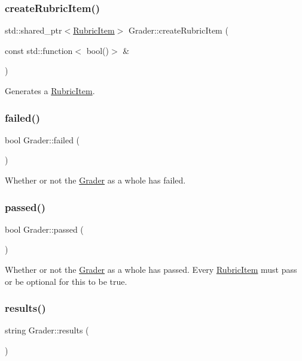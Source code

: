 \subsubsection{\texorpdfstring{create\+Rubric\+Item()}{createRubricItem()}\hspace{0.1cm}{\footnotesize\ttfamily [3/3]}}
{\footnotesize\ttfamily std\+::shared\+\_\+ptr$<$\hyperlink{class_rubric_item}{Rubric\+Item}$>$ Grader\+::create\+Rubric\+Item (\begin{DoxyParamCaption}\item[{const std\+::function$<$ bool()$>$ \&}]{ }\end{DoxyParamCaption})}

Generates a \hyperlink{class_rubric_item}{Rubric\+Item}. \hypertarget{class_grader_acac97fc41ff9582c6bcb167f7537ee08}{}\label{class_grader_acac97fc41ff9582c6bcb167f7537ee08} 
\subsubsection{\texorpdfstring{failed()}{failed()}}
{\footnotesize\ttfamily bool Grader\+::failed (\begin{DoxyParamCaption}{ }\end{DoxyParamCaption})}

Whether or not the \hyperlink{class_grader}{Grader} as a whole has failed. \hypertarget{class_grader_a478a74aee440cdd28c9d8c67bcf3fde1}{}\label{class_grader_a478a74aee440cdd28c9d8c67bcf3fde1} 
\subsubsection{\texorpdfstring{passed()}{passed()}}
{\footnotesize\ttfamily bool Grader\+::passed (\begin{DoxyParamCaption}{ }\end{DoxyParamCaption})}

Whether or not the \hyperlink{class_grader}{Grader} as a whole has passed. Every \hyperlink{class_rubric_item}{Rubric\+Item} must pass or be optional for this to be true. \hypertarget{class_grader_a11aecee1c8a72a7251906df8532259b1}{}\label{class_grader_a11aecee1c8a72a7251906df8532259b1} 
\subsubsection{\texorpdfstring{results()}{results()}}
{\footnotesize\ttfamily string Grader\+::results (\begin{DoxyParamCaption}{ }\end{DoxyParamCaption})}

